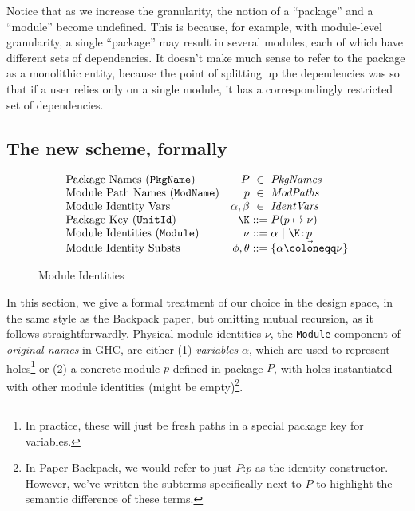 \documentclass{article}
\begin{document}
Notice that as we increase the granularity, the notion of a ``package'' and a ``module''
become undefined.  This is because, for example, with module-level granularity, a single
``package'' may result in several modules, each of which have different sets of
dependencies.  It doesn't make much sense to refer to the package as a monolithic entity,
because the point of splitting up the dependencies was so that if a user relies only
on a single module, it has a correspondingly restricted set of dependencies.
\subsection{The new scheme, formally}

\begin{wrapfigure}{R}{0.5\textwidth}
\begin{myfig}
\[
\begin{array}{@{}lr@{\;}c@{\;}l@{}}
    \text{Package Names (\texttt{PkgName})} & P &\in& \mathit{PkgNames} \\
    \text{Module Path Names (\texttt{ModName})} & p &\in& \mathit{ModPaths} \\
    \text{Module Identity Vars} & \alpha,\beta &\in& \mathit{IdentVars} \\
    \text{Package Key (\texttt{UnitId})} & \K &::=& P(\vec{p\mapsto\nu}) \\
    \text{Module Identities (\texttt{Module})} & \nu &::=&
      \alpha ~|~
      \K\colon\! p \\
    \text{Module Identity Substs} & \phi,\theta &::=&
      \{\vec{\alpha \coloneqq \nu}\} \\
\end{array}
\]
\caption{Module Identities}
\label{fig:mod-idents}
\end{myfig}
\end{wrapfigure}

In this section, we give a formal treatment of our choice in the design space, in the
same style as the Backpack paper, but omitting mutual recursion, as it follows straightforwardly.
Physical module
identities $\nu$, the \texttt{Module} component of \emph{original names} in GHC, are either (1) \emph{variables} $\alpha$, which are
used to represent holes\footnote{In practice, these will just be fresh paths in a special package key for variables.} or (2) a concrete module $p$ defined in package
$P$, with holes instantiated with other module identities (might be
empty)\footnote{In Paper Backpack, we would refer to just $P$:$p$ as the identity
constructor.  However, we've written the subterms specifically next to $P$ to highlight the semantic difference of these terms.}.
\end{document}

